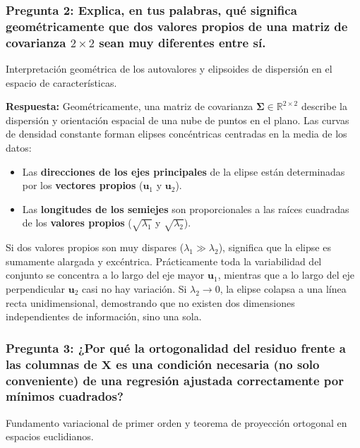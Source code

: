\documentclass[12pt,a4paper]{article}
\newcommand{\R}{\mathbb{R}}
\begin{document}
\vspace{10pt}
\subsubsection*{Pregunta 2: Explica, en tus palabras, qué significa geométricamente que dos valores propios de una matriz de covarianza $2 \times 2$ sean muy diferentes entre sí.}
\begin{pthreeProblem}
Interpretación geométrica de los autovalores y elipsoides de dispersión en el espacio de características.
\end{pthreeProblem}

\textbf{Respuesta:}
Geométricamente, una matriz de covarianza $\mathbf{\Sigma} \in \R^{2 \times 2}$ describe la dispersión y orientación espacial de una nube de puntos en el plano. Las curvas de densidad constante forman elipses concéntricas centradas en la media de los datos:
\begin{itemize}[label={\color{p3blue}$\blacktriangleright$}]
  \item Las \textbf{direcciones de los ejes principales} de la elipse están determinadas por los \textbf{vectores propios} ($\mathbf{u}_1$ y $\mathbf{u}_2$).
  \item Las \textbf{longitudes de los semiejes} son proporcionales a las raíces cuadradas de los \textbf{valores propios} ($\sqrt{\lambda_1}$ y $\sqrt{\lambda_2}$).
\end{itemize}

Si dos valores propios son muy dispares ($\lambda_1 \gg \lambda_2$), significa que la elipse es sumamente alargada y excéntrica. Prácticamente toda la variabilidad del conjunto se concentra a lo largo del eje mayor $\mathbf{u}_1$, mientras que a lo largo del eje perpendicular $\mathbf{u}_2$ casi no hay variación. Si $\lambda_2 \to 0$, la elipse colapsa a una línea recta unidimensional, demostrando que no existen dos dimensiones independientes de información, sino una sola.

\vspace{10pt}
\subsubsection*{Pregunta 3: ¿Por qué la ortogonalidad del residuo frente a las columnas de $\mathbf{X}$ es una condición necesaria (no solo conveniente) de una regresión ajustada correctamente por mínimos cuadrados?}
\begin{pthreeProblem}
Fundamento variacional de primer orden y teorema de proyección ortogonal en espacios euclidianos.
\end{pthreeProblem}
\end{document}
